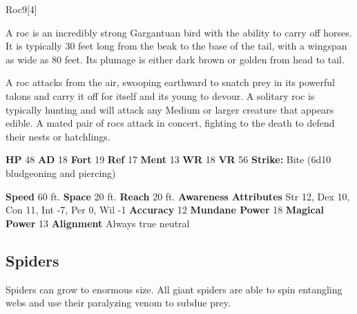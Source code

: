   
  \begin{monsection}{Roc}{9}[4]
    \vspace{-1em}\vspace{-1em}
    \vspace{0em}

    
        A roc is an incredibly strong Gargantuan bird with the ability to carry off horses.
        It is typically 30 feet long from the beak to the base of the tail, with a wingspan as wide as 80 feet.
        Its plumage is either dark brown or golden from head to tail.
      
        A roc attacks from the air, swooping earthward to snatch prey in its powerful talons and carry it off for itself and its young to devour.
        A solitary roc is typically hunting and will attack any Medium or larger creature that appears edible.
        A mated pair of rocs attack in concert, fighting to the death to defend their nests or hatchlings.
      

    \begin{spellcontent}
      \begin{spelltargetinginfo}
        \pari \textbf{HP} 48 \monsep
          \textbf{AD} 18 \monsep
          \textbf{Fort} 19 \monsep
          \textbf{Ref} 17 \monsep
          \textbf{Ment} 13
        \pari \textbf{WR} 18 \monsep
        \textbf{VR} 56
        \pari \textbf{Strike:}
            Bite  (6d10 bludgeoning and piercing)
      \end{spelltargetinginfo}
    \end{spellcontent}
    \begin{monsterfooter}
      \pari \textbf{Speed} 60 ft. \monsep
        \textbf{Space} 20 ft. \monsep
        \textbf{Reach} 20 ft.
      \pari \textbf{Awareness} 
      \pari \textbf{Attributes}
        Str 12, Dex 10,
        Con 11, Int -7,
        Per 0, Wil -1
      \pari \textbf{Accuracy} 12 \monsep
        \textbf{Mundane Power} 18 \monsep
      \textbf{Magical Power} 13
      \pari \textbf{Alignment} Always true neutral
    \end{monsterfooter}
  \end{monsection}
  
  
    \subsection{Spiders}
      
      Spiders can grow to enormous size.
      All giant spiders are able to spin entangling webs and use their paralyzing venom to subdue prey.
    
